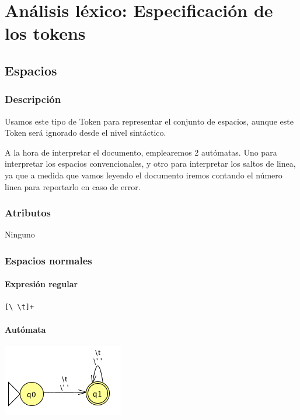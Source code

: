 
\chapter{Análisis léxico: Especificación de los tokens}
    
    \section{Espacios}
    
        \subsection{Descripción}
        
            Usamos este tipo de Token para representar el conjunto de espacios, aunque este Token será ignorado desde el nivel sintáctico.
        
            A la hora de interpretar el documento, emplearemos 2 autómatas. Uno para interpretar los espacios convencionales, y otro para interpretar los saltos de linea, ya que a medida que vamos leyendo el documento iremos contando el número linea para reportarlo en caso de error.
        
        \subsection{Atributos}
        
            Ninguno
            
	    \subsection{Espacios normales}
     
            \subsubsection{Expresión regular}
                \begin{lstlisting}[language=Perl]
[\ \t]+
                \end{lstlisting}

            \subsubsection{Autómata}
            
                \includegraphics[scale=.7]{../Design/jflap/Espacio.png}
                
